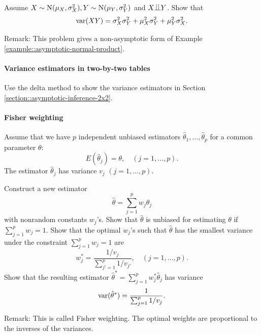 Assume $X\sim \textsc{N}(\mu_X, \sigma_X^2), Y\sim \textsc{N}(\mu_Y, \sigma_Y^2)$ and $X\ind Y$. Show that
$$
\textup{var}(XY) = \sigma_X^2 \sigma_Y^2 +\mu_X^2 \sigma_Y^2 + \mu_Y^2 \sigma_X^2 .
$$



Remark: This problem gives a non-asymptotic form of Example \ref{example::asymptotic-normal-product}. 




\paragraph{Variance estimators in two-by-two tables}\label{hw::variance-estimators-2x2}

Use the delta method to show the variance estimators in Section \ref{section::asymptotic-inference-2x2}. 




\paragraph{Fisher weighting}\label{hw::fisher-weighting}


Assume that we have $p$ independent unbiased estimators $\hat{\theta}_1, \ldots, \hat{\theta}_p$ for a common parameter $\theta$:
$$
E(\hat{\theta}_j) = \theta,\quad (j=1,\ldots, p).
$$
The estimator  $\hat{\theta}_j$ has variance $v_j$ $(j=1,\ldots, p)$. 

Construct a new estimator
$$
\hat{\theta} = \sum_{j=1}^p w_j \hat{\theta}_j
$$
with nonrandom constants $w_j$'s. 
Show that $\hat{\theta} $ is unbiased for estimating $\theta$ if $\sum_{j=1}^p w_j = 1$. Show that the optimal $w_j$'s such that $\hat{\theta} $ has the smallest variance under the constraint $\sum_{j=1}^p w_j = 1$ are
$$
w_j^* =  \frac{1/v_j}{ \sum_{j'=1}^p   1/v_{j'} }, \quad (j=1,\ldots, p).
$$
Show that the resulting estimator $\hat{\theta}^* = \sum_{j=1}^p w_j^* \hat{\theta}_j$ has variance
$$
\textup{var}(\hat{\theta}^*) =  \frac{1 }{ \sum_{j=1}^p   1/v_{j} }. 
$$


Remark: This is called Fisher weighting. The optimal weights are proportional to the inverses of the variances. 


